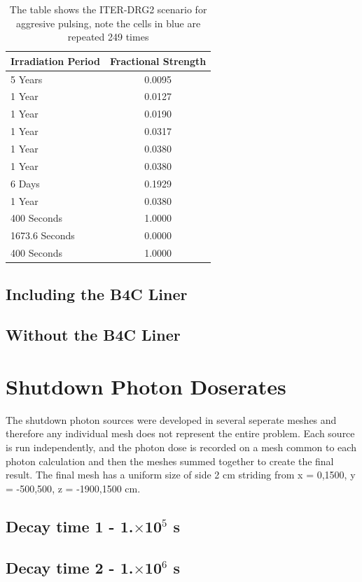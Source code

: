 \documentclass[12pt]{article}
\begin{document}
\begin{table}
   \begin{tabular}{| l | c |}
      \hline 
      Irradiation Period & Fractional Strength \\
      \hline
      5 Years & 0.0095 \\
      1 Year  & 0.0127 \\
      1 Year  & 0.0190 \\
      1 Year  & 0.0317 \\
      1 Year  & 0.0380 \\
      1 Year  & 0.0380 \\
      6 Days  & 0.1929 \\
      1 Year  & 0.0380 \\
      \cellcolor{blue!25} 400 Seconds & 1.0000 \\
      \cellcolor{blue!25}1673.6 Seconds & 0.0000 \\
      400 Seconds & 1.0000 \\
      \hline
\end{tabular}
\caption{The table shows the ITER-DRG2 scenario for aggresive pulsing, note the cells in \textcolor{blue!25}{blue} are repeated 249
 times}
\label{tag:irrad_scenario}
\end{table}

\subsection{Including the B4C Liner}
\subsection{Without the B4C Liner}
\section{Shutdown Photon Doserates}
The shutdown photon sources were developed in several seperate meshes and therefore any individual mesh does not represent the
entire problem. Each source is run independently, and the photon dose is recorded on a mesh common to each photon calculation and
then the meshes summed together to create the final result. The final mesh has a uniform size of side 2 cm striding from
x = {0,1500}, y = {-500,500}, z = {-1900,1500} cm.
\subsection{Decay time 1 - 1.$\times$10$^5$ s}
\subsection{Decay time 2 - 1.$\times$10$^6$ s}
\end{document}
